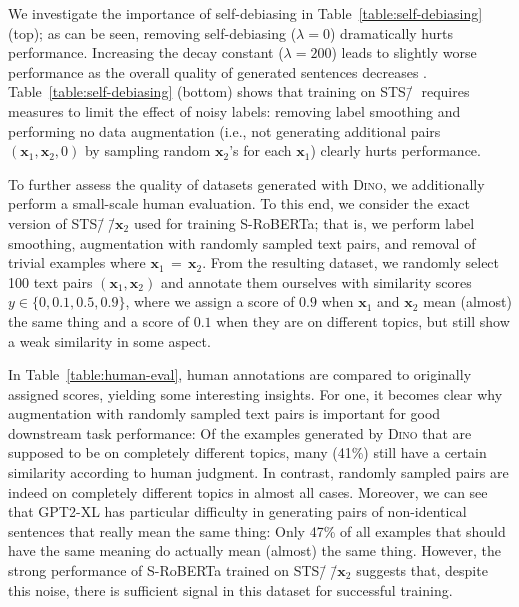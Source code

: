 \documentclass[11pt]{article}
\newcommand\ours{\textsc{Dino}}
\newcommand\ourDs{STS\=/🦕}
\newcommand\ourDsSemi{STS\=/🦕\=/$\mathbf{x}_2$}
\begin{document}
We investigate the importance of self-debiasing \citep{schick2021selfdiagnosis} in Table~\ref{table:self-debiasing} (top); as can be seen, removing self-debiasing ($\lambda = 0$) dramatically hurts performance.
Increasing the decay constant ($\lambda = 200$) leads to slightly worse performance as the overall quality of generated sentences decreases \citep{schick2021selfdiagnosis}.
Table~\ref{table:self-debiasing} (bottom) shows that training on \ourDs{} requires measures to limit the effect of noisy labels: removing label smoothing and performing no data augmentation (i.e., not generating additional pairs $(\mathbf{x}_1, \mathbf{x}_2, 0)$ by sampling random $\mathbf{x}_2$'s for each $\mathbf{x}_1$) clearly hurts performance. 

To further assess the quality of datasets generated with \ours{}, we additionally perform a small-scale human evaluation. To this end, we consider the exact version of \ourDsSemi{} used for training S-RoBERTa; that is, we perform label smoothing, augmentation with randomly sampled text pairs, and removal of trivial examples where $\mathbf{x}_1\,{=}\,\mathbf{x}_2$. From the resulting dataset, we randomly select 100 text pairs $(\mathbf{x}_1,\mathbf{x}_2)$ and annotate them ourselves with similarity scores $y \in \{0, 0.1, 0.5, 0.9\}$, where we assign a score of $0.9$ when $\mathbf{x}_1$ and $\mathbf{x}_2$ mean (almost) the same thing and a score of $0.1$ when they are on different topics, but still show a weak similarity in some aspect.

In Table~\ref{table:human-eval}, human annotations are compared to originally assigned scores, yielding some interesting insights. For one, it becomes clear why augmentation with randomly sampled text pairs is important for good downstream task performance: Of the examples generated by \ours{} that are supposed to be on completely different topics, many (41\%) still have a certain similarity according to human judgment. In contrast, randomly sampled pairs are indeed on completely different topics in almost all cases. Moreover, we can see that GPT2-XL has particular difficulty in generating pairs of non-identical sentences that really mean the same thing: Only 47\% of all examples that should have the same meaning do actually mean (almost) the same thing. However, the strong performance of S-RoBERTa trained on \ourDsSemi{} suggests that, despite this noise, there is sufficient signal in this dataset for successful training.
\end{document}
